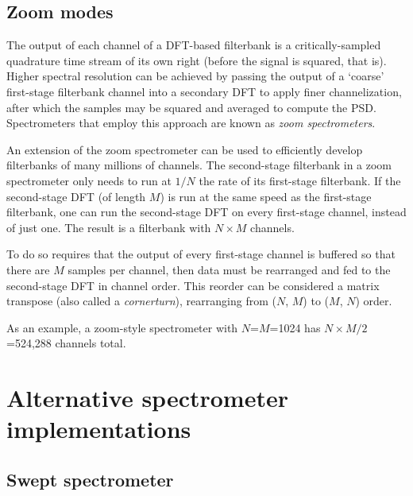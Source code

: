 \documentclass{ws-rv961x669}
\begin{document}
\subsection{Zoom modes}

The output of each channel of a DFT-based filterbank is a critically-sampled quadrature time stream of its own right (before the signal is squared, that is). Higher spectral resolution can be achieved by passing the output of a `coarse' first-stage filterbank channel into a secondary DFT to apply finer channelization, after which the samples may be squared and averaged to compute the PSD. Spectrometers that employ this approach are known as \emph{zoom spectrometers}. 

An extension of the zoom spectrometer can be used to efficiently develop filterbanks of many millions of channels. The second-stage filterbank in a zoom spectrometer only needs to run at $1/N$ the rate of its first-stage filterbank. If the second-stage DFT (of length $M$) is run at the same speed as the first-stage filterbank, one can run the second-stage DFT on every first-stage channel, instead of just one. The result is a filterbank with $N\times M$ channels. 

To do so requires that the output of every first-stage channel is buffered so that there are $M$ samples per channel, then data must be rearranged and fed to the second-stage DFT in channel order. This reorder can be considered a matrix transpose (also called a \emph{cornerturn}), rearranging from ($N$, $M$) to ($M$, $N$) order.

As an example, a zoom-style spectrometer with $N$=$M$=1024 has $N\times M / 2$=524,288 channels total. 


\section{Alternative spectrometer implementations}

\subsection{Swept spectrometer}\label{swept-spectrometer}

\end{document}
